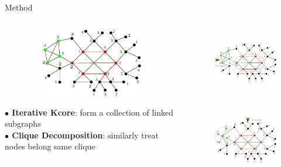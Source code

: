 \documentclass{beamer}
\begin{document}
\begin{frame}[t]{Method}
\vspace{-1cm}
\begin{columns}[t] %
\begin{column}[t]{.5\textwidth}
	\begin{figure}
	  \includegraphics[width=1.0\textwidth, height=3.0cm]{images/Decomposition_1.pdf}
	\end{figure} 
	
	\textbf{$\bullet$ Iterative Kcore}: form a collection of linked subgraphs \vspace{.5em}\\
	\textbf{$\bullet$ Clique Decomposition}: similarly treat nodes belong same clique \vspace{.5em}\\ 
	
\end{column}%
\begin{column}{.5\textwidth}
	\begin{figure}
	  \includegraphics[width=1.0\textwidth, height=3.0cm]{images/Kcore.pdf}
	\end{figure}

	\begin{figure} \vspace{-.8cm}
	  \includegraphics[width=1.0\textwidth, height=3.0cm]{images/Clique.pdf}
	\end{figure}

\end{column}%
\end{columns}
\end{frame}
\end{document}

